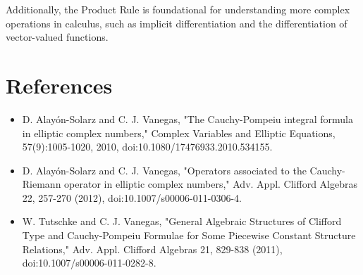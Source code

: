 \documentclass[11pt,a4paper]{article}
\begin{document}
Additionally, the Product Rule is foundational for understanding more complex operations in calculus, such as implicit differentiation and the differentiation of vector-valued functions.

\section{References}
\begin{itemize}
    \item D. Alayón-Solarz and C. J. Vanegas, "The Cauchy-Pompeiu integral formula in elliptic complex numbers," Complex Variables and Elliptic Equations, 57(9):1005-1020, 2010, doi:10.1080/17476933.2010.534155.
    \item D. Alayón-Solarz and C. J. Vanegas, "Operators associated to the Cauchy-Riemann operator in elliptic complex numbers," Adv. Appl. Clifford Algebras 22, 257-270 (2012), doi:10.1007/s00006-011-0306-4.
    \item W. Tutschke and C. J. Vanegas, "General Algebraic Structures of Clifford Type and Cauchy-Pompeiu Formulae for Some Piecewise Constant Structure Relations," Adv. Appl. Clifford Algebras 21, 829-838 (2011), doi:10.1007/s00006-011-0282-8.
\end{itemize}
\end{document}
